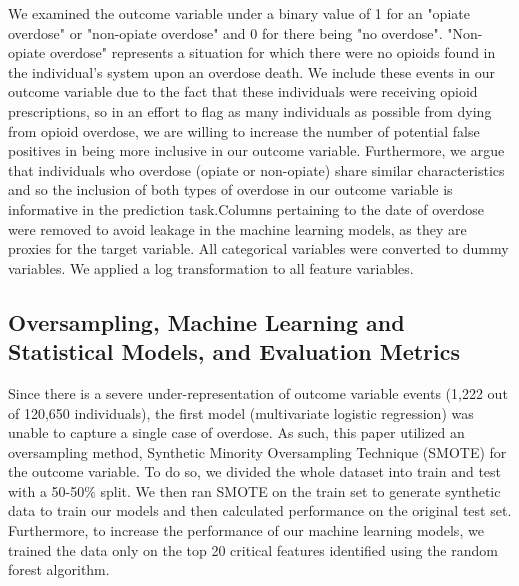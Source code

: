 \documentclass[twoside,10.5pt]{article}
\begin{document}
We examined the outcome variable under a binary value of 1 for an "opiate overdose" or "non-opiate overdose" and 0 for there being "no overdose". "Non-opiate overdose" represents a situation for which there were no opioids found in the individual's system upon an overdose death. We include these events in our outcome variable due to the fact that these individuals were receiving opioid prescriptions, so in an effort to flag as many individuals as possible from dying from opioid overdose, we are willing to increase the number of potential false positives in being more inclusive in our outcome variable. Furthermore, we argue that individuals who overdose (opiate or non-opiate) share similar characteristics and so the inclusion of both types of overdose in our outcome variable is informative in the prediction task.Columns pertaining to the date of overdose were removed to avoid leakage in the machine learning models, as they are proxies for the target variable. All categorical variables were converted to dummy variables. We applied a log transformation to all feature variables. 

\subsection{Oversampling, Machine Learning and Statistical Models, and Evaluation Metrics}
Since there is a severe under-representation of outcome variable events (1,222 out of 120,650 individuals), the first model (multivariate logistic regression) was unable to capture a single case of overdose. As such, this paper utilized an oversampling method, Synthetic Minority Oversampling Technique (SMOTE) for the outcome variable. To do so, we divided the whole dataset into train and test with a 50-50\% split. We then ran SMOTE on the train set to generate synthetic data to train our models and then calculated performance on the original test set. Furthermore, to increase the performance of our machine learning models, we trained the data only on the top 20 critical features identified using the random forest algorithm.\\
\end{document}
